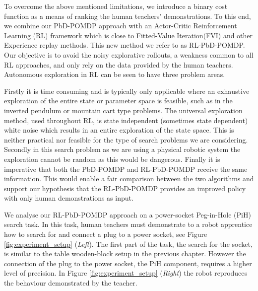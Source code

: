 
To overcome the above mentioned limitations, we introduce a binary cost function as a means of ranking the human teachers' demonstrations.
To this end, we combine our PbD-POMDP approach with an Actor-Critic Reinforcement Learning (RL) framework which 
is close to Fitted-Value Iteration(FVI) and other Experience replay methods. This new method we refer to as RL-PbD-POMDP. 
Our objective is to avoid the noisy explorative rollouts, a weakness common to all RL approaches, and only rely on 
the data provided by the human teachers. Autonomous exploration in RL can be seen to have three problem areas.

Firstly it is time consuming and is typically only applicable where an exhaustive exploration 
of the entire state or parameter space is feasible, such as in the inverted pendulum or mountain cart type problems. 
The universal exploration method, used throughout RL, is state independent (sometimes state dependent) white noise 
which results in an entire exploration of the state space. This
is neither practical nor feasible for the type of search problems we are considering. Secondly in this search 
problem as we are using a physical robotic system the exploration cannot be random as this would be dangerous.
Finally it is imperative that both the PbD-POMDP and RL-PbD-POMDP receive the same information. This would enable a fair comparison 
between the two algorithms and support our hypothesis that the RL-PbD-POMDP provides an improved policy 
with only human demonstrations as input.

We analyse our RL-PbD-POMDP approach on a power-socket Peg-in-Hole (PiH) search task. In this task, human teachers must demonstrate 
to a robot apprentice how to search for and connect a plug to a power socket, see Figure \ref{fig:experiment_setup} (\textit{Left}). 
The first part of the task, the search for the socket, is similar to the table wooden-block setup in the previous chapter. 
However the connection of the plug to the power socket, the PiH component, requires a higher level of precision.
In Figure \ref{fig:experiment_setup} (\textit{Right}) the robot reproduces the behaviour demonstrated by the teacher.

